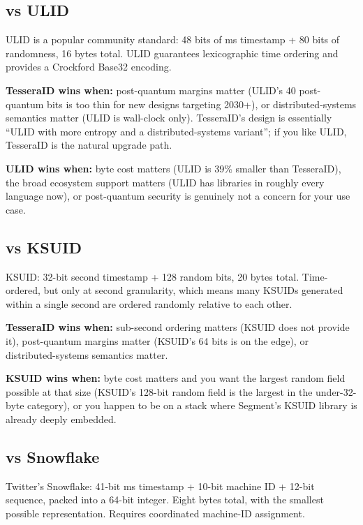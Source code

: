 \subsection{vs ULID \citep{ulid}}

ULID is a popular community standard: 48 bits of ms timestamp + 80 bits of randomness, 16 bytes total. ULID guarantees lexicographic time ordering and provides a Crockford Base32 encoding.

\textbf{TesseraID wins when:} post-quantum margins matter (ULID's 40 post-quantum bits is too thin for new designs targeting 2030+), or distributed-systems semantics matter (ULID is wall-clock only). TesseraID's design is essentially ``ULID with more entropy and a distributed-systems variant''; if you like ULID, TesseraID is the natural upgrade path.

\textbf{ULID wins when:} byte cost matters (ULID is 39\% smaller than TesseraID), the broad ecosystem support matters (ULID has libraries in roughly every language now), or post-quantum security is genuinely not a concern for your use case.

\subsection{vs KSUID \citep{ksuid}}

KSUID: 32-bit second timestamp + 128 random bits, 20 bytes total. Time-ordered, but only at second granularity, which means many KSUIDs generated within a single second are ordered randomly relative to each other.

\textbf{TesseraID wins when:} sub-second ordering matters (KSUID does not provide it), post-quantum margins matter (KSUID's 64 bits is on the edge), or distributed-systems semantics matter.

\textbf{KSUID wins when:} byte cost matters and you want the largest random field possible at that size (KSUID's 128-bit random field is the largest in the under-32-byte category), or you happen to be on a stack where Segment's KSUID library is already deeply embedded.

\subsection{vs Snowflake \citep{snowflake}}

Twitter's Snowflake: 41-bit ms timestamp + 10-bit machine ID + 12-bit sequence, packed into a 64-bit integer. Eight bytes total, with the smallest possible representation. Requires coordinated machine-ID assignment.

